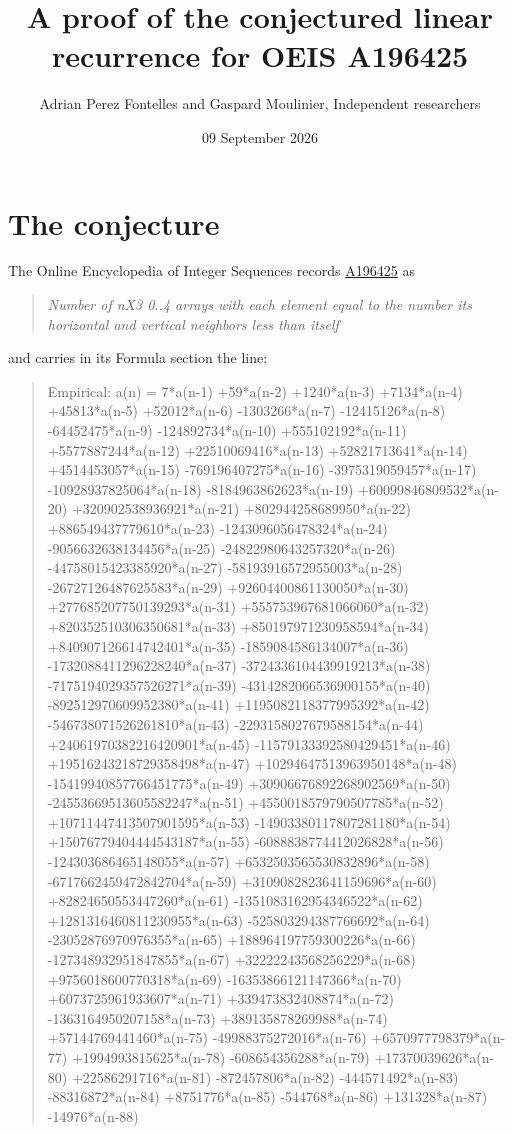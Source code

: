 \documentclass[11pt]{article}
\title{A proof of the conjectured linear recurrence for OEIS A196425}
\author{Adrian Perez Fontelles and Gaspard Moulinier, Independent researchers}
\date{09 September 2026}
\theoremstyle{definition}
\begin{document}
\maketitle
\section{The conjecture}

The Online Encyclopedia of Integer Sequences records \href{https://oeis.org/A196425}{A196425} as

\begin{quote}\itshape Number of nX3 0..4 arrays with each element equal to the number its horizontal and vertical neighbors less than itself\end{quote}

and carries in its Formula section the line:

\begin{quote}\ttfamily Empirical: a(n) = 7*a(n-1) +59*a(n-2) +1240*a(n-3) +7134*a(n-4) +45813*a(n-5) +52012*a(n-6) -1303266*a(n-7) -12415126*a(n-8) -64452475*a(n-9) -124892734*a(n-10) +555102192*a(n-11) +5577887244*a(n-12) +22510069416*a(n-13) +52821713641*a(n-14) +4514453057*a(n-15) -769196407275*a(n-16) -3975319059457*a(n-17) -10928937825064*a(n-18) -8184963862623*a(n-19) +60099846809532*a(n-20) +320902538936921*a(n-21) +802944258689950*a(n-22) +886549437779610*a(n-23) -1243096056478324*a(n-24) -9056632638134456*a(n-25) -24822980643257320*a(n-26) -44758015423385920*a(n-27) -58193916572955003*a(n-28) -26727126487625583*a(n-29) +92604400861130050*a(n-30) +277685207750139293*a(n-31) +555753967681066060*a(n-32) +820352510306350681*a(n-33) +850197971230958594*a(n-34) +840907126614742401*a(n-35) -1859084586134007*a(n-36) -1732088411296228240*a(n-37) -3724336104439919213*a(n-38) -7175194029357526271*a(n-39) -4314282066536900155*a(n-40) -892512970609952380*a(n-41) +1195082118377995392*a(n-42) -546738071526261810*a(n-43) -2293158027679588154*a(n-44) +24061970382216420901*a(n-45) -11579133392580429451*a(n-46) +19516243218729358498*a(n-47) +10294647513963950148*a(n-48) -15419940857766451775*a(n-49) +30906676892268902569*a(n-50) -24553669513605582247*a(n-51) +4550018579790507785*a(n-52) +10711447413507901595*a(n-53) -14903380117807281180*a(n-54) +15076779404444543187*a(n-55) -6088838774412026828*a(n-56) -124303686465148055*a(n-57) +6532503565530832896*a(n-58) -6717662459472842704*a(n-59) +3109082823641159696*a(n-60) +82824650553447260*a(n-61) -1351083162954346522*a(n-62) +1281316460811230955*a(n-63) -525803294387766692*a(n-64) -23052876970976355*a(n-65) +188964197759300226*a(n-66) -127348932951847855*a(n-67) +32222243568256229*a(n-68) +9756018600770318*a(n-69) -16353866121147366*a(n-70) +6073725961933607*a(n-71) +339473832408874*a(n-72) -1363164950207158*a(n-73) +389135878269988*a(n-74) +57144769441460*a(n-75) -49988375272016*a(n-76) +6570977798379*a(n-77) +1994993815625*a(n-78) -608654356288*a(n-79) +17370039626*a(n-80) +22586291716*a(n-81) -872457806*a(n-82) -444571492*a(n-83) -88316872*a(n-84) +8751776*a(n-85) -544768*a(n-86) +131328*a(n-87) -14976*a(n-88)\end{quote}
\end{document}

